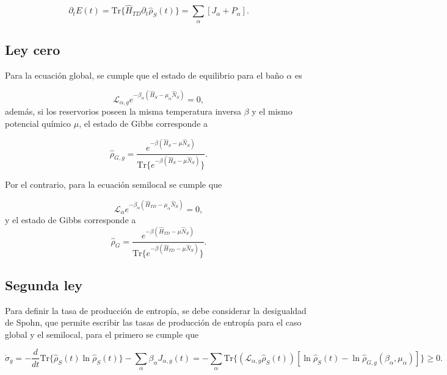 \begin{equation*}
    \partial_{t}E(t) = \text{Tr}\{ \hat{H}_{TD}\partial_{t}\hat{\rho}_{S}(t) \} = \sum_{\alpha}[J_{\alpha} + P_{\alpha}].
\end{equation*}

\subsection{Ley cero}
Para la ecuación global, se cumple que el estado de equilibrio para el baño $\alpha$ es 

\begin{equation*}
    \mathcal{L}_{\alpha,g}e^{-\beta_{\alpha}(\hat{H}_{S} - \mu_{\alpha}\hat{N}_{S})} = 0,
\end{equation*}
además, si los reservorios poseen la misma temperatura inversa $\beta$ y el mismo potencial químico $\mu$, el estado de Gibbs corresponde a

\begin{equation*}
    \hat{\rho}_{G,g} = \frac{e^{-\beta(\hat{H}_{S} - \mu \hat{N}_{S})}}{\text{Tr}\{ e^{-\beta(\hat{H}_{S} - \mu \hat{N}_{S})}\}}.
\end{equation*}

Por el contrario, para la ecuación semilocal se cumple que

\begin{equation}
    \mathcal{L}_{\alpha}e^{-\beta_{\alpha}(\hat{H}_{TD} - \mu_{\alpha}\hat{N}_{S})} = 0,
\label{sec2cerolaw}
\end{equation}
y el estado de Gibbs corresponde a 
\begin{equation*}
    \hat{\rho}_{G} = \frac{e^{-\beta(\hat{H}_{TD} - \mu \hat{N}_{S})}}{\text{Tr}\{ e^{-\beta(\hat{H}_{TD} - \mu \hat{N}_{S})}\}}.
\end{equation*}

\subsection{Segunda ley}
Para definir la tasa de producción de entropía, se debe considerar la desigualdad de Spohn\cite{spohn2007irreversible}, que permite escribir las tasas de producción de entropía para el caso global y el semilocal\cite{potts2021thermodynamically}, para el primero se cumple que 

\begin{equation*}
    \dot{\sigma}_{g} = - \frac{d}{dt}\text{Tr}\{\hat{\rho}_{S}(t) \ln \hat{\rho}_{S}(t) \} - \sum_{\alpha} \beta_{\alpha} J_{\alpha,g}(t) = -\sum_{\alpha} \text{Tr}\{(\mathcal{L}_{\alpha,g}\hat{\rho}_{S}(t))[\ln \hat{\rho}_{S}(t) - \ln \hat{\rho}_{G,g}(\beta_{\alpha},\mu_{\alpha})] \} \geq 0.
\end{equation*}

